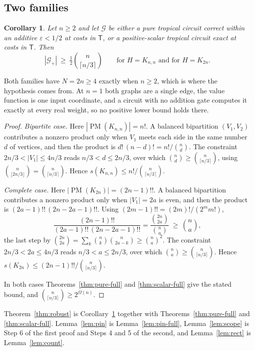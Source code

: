 \documentclass[11pt]{article}
\newtheorem{corollary}[theorem]{Corollary}
\newcommand{\PM}{\operatorname{PM}}
\begin{document}
\subsection{Two families}

\begin{corollary}
\label{cor:families}
Let $n\ge2$ and let $\mathcal G$ be either a pure tropical circuit correct within
an additive $\varepsilon<1/2$ at costs in $\mathsf T$, or a positive-scalar
tropical circuit exact at costs in $\mathsf T$.  Then
\[
  |\mathcal G_+|\ \ge\ \tfrac12\binom{n}{\lceil n/3\rceil}
  \qquad\text{for } H=K_{n,n} \text{ and for } H=K_{2n}.
\]
\end{corollary}

Both families have $N=2n\ge4$ exactly when $n\ge2$, which is where the
hypothesis comes from.  At $n=1$ both graphs are a single edge, the value
function is one input coordinate, and a circuit with no addition gate computes
it exactly at every real weight, so no positive lower bound holds there.

\begin{proof}
\emph{Bipartite case.}  Here $|\PM(K_{n,n})|=n!$.  A balanced bipartition
$(V_1,V_2)$ contributes a nonzero product only when $V_1$ meets each side in the
same number $d$ of vertices, and then the product is $d!\,(n-d)!=n!/\binom nd$.
The constraint $2n/3<|V_1|\le4n/3$ reads $n/3<d\le2n/3$, over which
$\binom nd\ge\binom{n}{\lceil n/3\rceil}$, using
$\binom{n}{\lfloor2n/3\rfloor}=\binom{n}{\lceil n/3\rceil}$.  Hence
$s(K_{n,n})\le n!\big/\binom{n}{\lceil n/3\rceil}$.

\emph{Complete case.}  Here $|\PM(K_{2n})|=(2n-1)!!$.  A balanced bipartition
contributes a nonzero product only when $|V_1|=2a$ is even, and then the product
is $(2a-1)!!\,(2n-2a-1)!!$.  Using $(2m-1)!!=(2m)!/(2^mm!)$,
\[
  \frac{(2n-1)!!}{(2a-1)!!\,(2n-2a-1)!!}
  =\frac{\binom{2n}{2a}}{\binom na}
  \ \ge\ \binom na ,
\]
the last step by $\binom{2n}{2a}=\sum_k\binom nk\binom n{2a-k}\ge\binom na^2$.
The constraint $2n/3<2a\le4n/3$ reads $n/3<a\le2n/3$, over which
$\binom na\ge\binom{n}{\lceil n/3\rceil}$.  Hence
$s(K_{2n})\le(2n-1)!!\big/\binom{n}{\lceil n/3\rceil}$.

In both cases Theorems~\ref{thm:pure-full} and \ref{thm:scalar-full} give the
stated bound, and $\binom{n}{\lceil n/3\rceil}\ge2^{\Omega(n)}$.
\end{proof}

Theorem~\ref{thm:robust} is Corollary~\ref{cor:families} together with
Theorems~\ref{thm:pure-full} and \ref{thm:scalar-full}.  Lemma~\ref{lem:pin} is
Lemma~\ref{lem:pin-full}, Lemma~\ref{lem:scope} is Step 6 of the first proof and
Steps 4 and 5 of the second, and Lemma~\ref{lem:rect} is Lemma~\ref{lem:count}.
\end{document}
